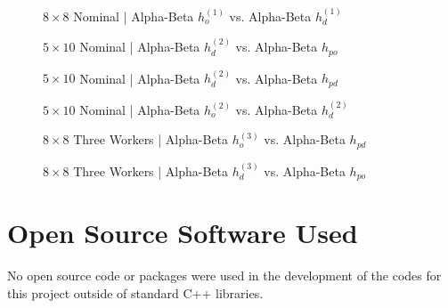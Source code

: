\documentclass{article}[12pt]
\begin{document}
\begin{appendices}
\begin{figure}[!htb]
	\centering
	\caption{$8 \times 8$ Nominal | Alpha-Beta $h_{o}^{(1)}$ vs. Alpha-Beta $h_{d}^{(1)}$}
\end{figure}

\begin{figure}[!htb]
	\centering
	\caption{$5 \times 10$ Nominal | Alpha-Beta $h_{d}^{(2)}$ vs. Alpha-Beta $h_{po}$}
\end{figure}

\begin{figure}[!htb]
	\centering
	\caption{$5 \times 10$ Nominal | Alpha-Beta $h_{d}^{(2)}$ vs. Alpha-Beta $h_{pd}$}
\end{figure}

\begin{figure}[!htb]
	\centering
	\caption{$5 \times 10$ Nominal | Alpha-Beta $h_{o}^{(2)}$ vs. Alpha-Beta $h_{d}^{(2)}$}
\end{figure}

\begin{figure}[!htb]
	\centering
	\caption{$8 \times8 $ Three Workers | Alpha-Beta $h_{o}^{(3)}$ vs. Alpha-Beta $h_{pd}$}
\end{figure}

\begin{figure}[!htb]
	\centering
	\caption{$8 \times8 $ Three Workers | Alpha-Beta $h_{d}^{(3)}$ vs. Alpha-Beta $h_{po}$}
\end{figure}


   
   \section{Open Source Software Used}
   No open source code or packages were used in the development of the codes for this project outside of standard C++ libraries.

\end{appendices}   
   
   
   
\end{document}
